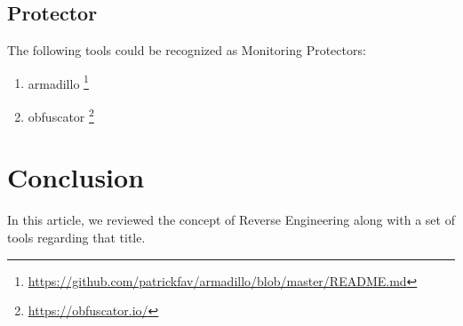 \documentclass[twocolumn]{article}
\begin{document}
\subsection{Protector}
The following tools could be recognized as Monitoring Protectors:
\begin{enumerate}
	\item armadillo \footnote{\url{https://github.com/patrickfav/armadillo/blob/master/README.md}}
	\item obfuscator \footnote{\url{https://obfuscator.io/}}
\end{enumerate}

\section{Conclusion}
In this article, we reviewed the concept of Reverse Engineering along with a set
of tools regarding that title.



\end{document}
